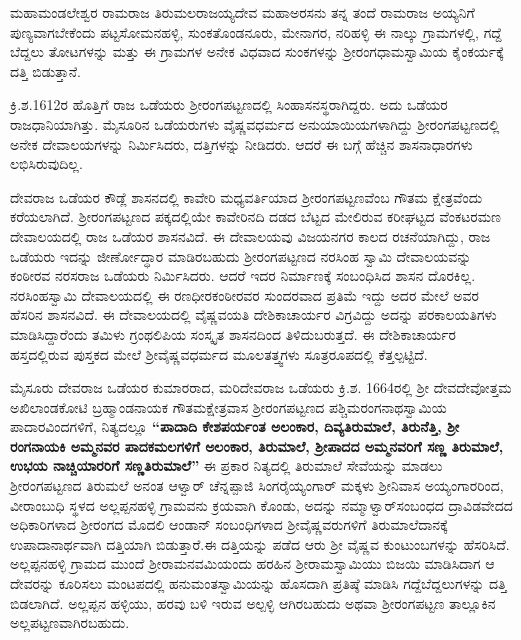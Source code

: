 ಮಹಾಮಂಡಲೇಶ್ವರ ರಾಮರಾಜ ತಿರುಮಲರಾಜಯ್ಯದೇವ ಮಹಾಅರಸನು ತನ್ನ ತಂದೆ ರಾಮರಾಜ ಅಯ್ಯನಿಗೆ ಪುಣ್ಯವಾಗಬೇಕೆಂದು ಪಟ್ಟಸೋಮನಹಳ್ಳಿ, ಸುಂಕತೊಂಡನೂರು, ಮೇನಾಗರ, ನರಿಹಳ್ಳಿ ಈ ನಾಲ್ಕು ಗ್ರಾಮಗಳಲ್ಲಿ, ಗದ್ದೆ ಬೆದ್ದಲು ತೋಟಗಳನ್ನು ಮತ್ತು ಈ ಗ್ರಾಮಗಳ ಅನೇಕ ವಿಧವಾದ ಸುಂಕಗಳನ್ನು ಶ‍್ರೀರಂಗಧಾಮಸ್ವಾಮಿಯ ಕೈಂಕರ್ಯಕ್ಕೆ ದತ್ತಿ ಬಿಡುತ್ತಾನೆ.

ಕ್ರಿ.ಶ.1612ರ ಹೊತ್ತಿಗೆ ರಾಜ ಒಡೆಯರು ಶ‍್ರೀರಂಗಪಟ್ಟಣದಲ್ಲಿ ಸಿಂಹಾಸನಸ್ಥರಾಗಿದ್ದರು. ಅದು ಒಡೆಯರ ರಾಜಧಾನಿಯಾಗಿತ್ತು. ಮೈಸೂರಿನ ಒಡೆಯರುಗಳು ವೈಷ್ಣವಧರ್ಮದ ಅನುಯಾಯಿಯಗಳಾಗಿದ್ದು ಶ‍್ರೀರಂಗಪಟ್ಟಣದಲ್ಲಿ ಅನೇಕ ದೇವಾಲಯಗಳನ್ನು ನಿರ್ಮಿಸಿದರು, ದತ್ತಿಗಳನ್ನು ನೀಡಿದರು. ಆದರೆ ಈ ಬಗ್ಗೆ ಹೆಚ್ಚಿನ ಶಾಸನಾಧಾರಗಳು ಲಭಿಸಿರುವುದಿಲ್ಲ.

ದೇವರಾಜ ಒಡೆಯರ ಕೌಡ್ಲೆ ಶಾಸನದಲ್ಲಿ ಕಾವೇರಿ ಮಧ್ಯವರ್ತಿಯಾದ ಶ‍್ರೀರಂಗಪಟ್ಟಣವೆಂಬ ಗೌತಮ ಕ್ಷೇತ್ರವೆಂದು ಕರೆಯಲಾಗಿದೆ. ಶ‍್ರೀರಂಗಪಟ್ಟಣದ ಪಕ್ಕದಲ್ಲಿಯೇ ಕಾವೇರಿನದಿ ದಡದ ಬೆಟ್ಟದ ಮೇಲಿರುವ ಕರೀಘಟ್ಟದ ವೆಂಕಟರಮಣ ದೇವಾಲಯದಲ್ಲಿ ರಾಜ ಒಡೆಯರ ಶಾಸನವಿದೆ. ಈ ದೇವಾಲಯವು ವಿಜಯನಗರ ಕಾಲದ ರಚನೆಯಾಗಿದ್ದು, ರಾಜ ಒಡೆಯರು ಇದನ್ನು ಜೀರ್ಣೋದ್ಧಾರ ಮಾಡಿರಬಹುದು ಶ‍್ರೀರಂಗಪಟ್ಟಣದ ನರಸಿಂಹ ಸ್ವಾಮಿ ದೇವಾಲಯವನ್ನು ಕಂಠೀರವ ನರಸರಾಜ ಒಡೆಯರು ನಿರ್ಮಿಸಿದರು. ಆದರೆ ಇದರ ನಿರ್ಮಾಣಕ್ಕೆ ಸಂಬಂಧಿಸಿದ ಶಾಸನ ದೊರಕಿಲ್ಲ. ನರಸಿಂಹಸ್ವಾಮಿ ದೇವಾಲಯದಲ್ಲಿ ಈ ರಣಧೀರಕಂಠೀರವರ ಸುಂದರವಾದ ಪ್ರತಿಮೆ ಇದ್ದು ಅದರ ಮೇಲೆ ಅವರ ಹೆಸರಿನ ಶಾಸನವಿದೆ. ಈ ದೇವಾಲಯದಲ್ಲಿ ವೈಷ್ಣವಯತಿ ದೇಶಿಕಾಚಾರ್ಯರ ವಿಗ್ರವಿದ್ದು ಅದನ್ನು ಪರಕಾಲಯತಿಗಳು ಮಾಡಿಸಿದ್ದಾರೆಂದು ತಮಿಳು ಗ್ರಂಥಲಿಪಿಯ ಸಂಸ್ಕೃತ ಶಾಸನದಿಂದ ತಿಳಿದುಬರುತ್ತದೆ. ಈ ದೇಶಿಕಾಚಾರ್ಯರ ಹಸ್ತದಲ್ಲಿರುವ ಪುಸ್ತಕದ ಮೇಲೆ ಶ‍್ರೀವೈಷ್ಣವಧರ್ಮದ ಮೂಲತತ್ತ್ವಗಳು ಸೂತ್ರರೂಪದಲ್ಲಿ ಕೆತ್ತಲ್ಪಟ್ಟಿದೆ.

ಮೈಸೂರು ದೇವರಾಜ ಒಡೆಯರ ಕುಮಾರರಾದ, ಮರಿದೇವರಾಜ ಒಡೆಯರು ಕ್ರಿ.ಶ. 1664ರಲ್ಲಿ ಶ‍್ರೀ ದೇವದೇವೋತ್ತಮ ಅಖಿಲಾಂಡಕೋಟಿ ಬ್ರಹ್ಮಾಂಡನಾಯಕ ಗೌತಮಕ್ಷೇತ್ರವಾಸ ಶ‍್ರೀರಂಗಪಟ್ಟಣದ ಪಶ್ಚಿಮರಂಗನಾಥಸ್ವಾಮಿಯ ಪಾದಾರವಿಂದ\-ಗಳಿಗೆ, ನಿತ್ಯದಲ್ಲೂ \textbf{“ಪಾದಾದಿ ಕೇಶಪರ್ಯಂತ ಅಲಂಕಾರ, ದಿವ್ಯತಿರುಮಾಲೆ, ತಿರುನೆತ್ತಿ, ಶ‍್ರೀ ರಂಗನಾಯಕಿ ಅಮ್ಮನವರ ಪಾದಕಮಲಗಳಿಗೆ ಅಲಂಕಾರ, ತಿರುಮಾಲೆ, ಶ‍್ರೀಪಾದದ ಅಮ್ಮನವರಿಗೆ ಸಣ್ಣ ತಿರುಮಾಲೆ, ಉಭಯ ನಾಚ್ಚಿಯಾರರಿಗೆ ಸಣ್ಣತಿರುಮಾಲೆ”} ಈ ಪ್ರಕಾರ ನಿತ್ಯದಲ್ಲಿ ತಿರುಮಾಲೆ ಸೇವೆಯನ್ನು ಮಾಡಲು ಶ‍್ರೀರಂಗಪಟ್ಟಣದ ತಿರುಮಲೆ ಅನಂತ ಆಳ್ವಾರ್​ ಚೆನ್ನಪ್ಪಾಜಿ ಸಿಂಗರೈಯ್ಯಂಗಾರ್​ ಮಕ್ಕಳು ಶ‍್ರೀನಿವಾಸ ಅಯ್ಯಂಗಾರರಿಂದ, ವೀರಾಂಬುಧಿ ಸ್ಥಳದ ಅಲ್ಲಪ್ಪನಹಳ್ಳಿ ಗ್ರಾಮವನು ಕ್ರಯವಾಗಿ ಕೊಂಡು, ಅದನ್ನು ನಮ್ಮಾಳ್ವಾರ್​ ಸಂಬಂಧದ ದ್ರಾವಿಡವೇದದ ಅಧಿಕಾರಿಗಳಾದ ಶ‍್ರೀರಂಗದ ಮೊದಲಿ ಆಂಡಾನ್ ಸಂಬಂಧಿಗಳಾದ ಶ‍್ರೀವೈಷ್ಣವರುಗಳಿಗೆ ತಿರುಮಾಲೆದಾನಕ್ಕೆ ಉಪಾದಾನಾರ್ಥವಾಗಿ ದತ್ತಿಯಾಗಿ ಬಿಡುತ್ತಾರೆ.ಈ ದತ್ತಿಯನ್ನು ಪಡೆದ ಆರು ಶ‍್ರೀ ವೈಷ್ಣವ ಕುಂಟುಂಬಗಳನ್ನು ಹೆಸರಿಸಿದೆ. ಅಲ್ಲಪ್ಪನಹಳ್ಳಿ ಗ್ರಾಮದ ಮುಂದೆ ಶ‍್ರೀರಾಮನವಮಿಯಂದು ಹರಹಿನ ಶ‍್ರೀರಾಮಸ್ವಾಮಿಯು ಬಿಜಯಿ ಮಾಡಿಸಿದಾಗ ಆ ದೇವರನ್ನು ಕೂರಿಸಲು ಮಂಟಪದಲ್ಲಿ ಹನುಮಂತಸ್ವಾಮಿಯನ್ನು ಹೊಸದಾಗಿ ಪ್ರತಿಷ್ಠೆ ಮಾಡಿಸಿ ಗದ್ದೆಬೆದ್ದಲುಗಳನ್ನು ದತ್ತಿ ಬಿಡಲಾಗಿದೆ. ಅಲ್ಲಪ್ಪನ ಹಳ್ಳಿಯು, ಹರವು ಬಳಿ ಇರುವ ಅಲ್ಪಳ್ಳಿ ಆಗಿರಬಹುದು ಅಥವಾ ಶ‍್ರೀರಂಗಪಟ್ಟಣ ತಾಲ್ಲೂಕಿನ ಅಲ್ಲಪಟ್ಟಣವಾಗಿರಬಹುದು.

